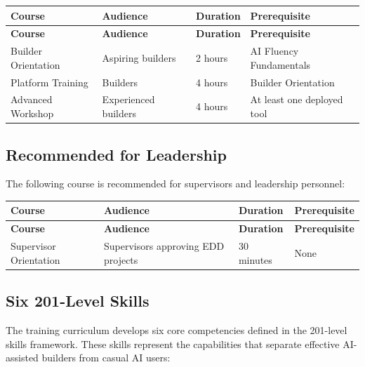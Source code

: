 \documentclass[11pt,letterpaper]{article}
\begin{document}
\begin{longtable}{@{}p{3.5cm}p{3.5cm}p{2cm}p{4.5cm}@{}}
\toprule
\textbf{Course} & \textbf{Audience} & \textbf{Duration} & \textbf{Prerequisite} \\
\midrule
\endfirsthead
\toprule
\textbf{Course} & \textbf{Audience} & \textbf{Duration} & \textbf{Prerequisite} \\
\midrule
\endhead
\bottomrule
\endlastfoot
Builder Orientation & Aspiring builders & 2 hours & AI Fluency Fundamentals \\
\midrule
Platform Training & Builders & 4 hours & Builder Orientation \\
\midrule
Advanced Workshop & Experienced builders & 4 hours & At least one deployed tool \\
\end{longtable}

\subsection{Recommended for Leadership}
\label{sec:training-leadership}

The following course is recommended for supervisors and leadership personnel:

\begin{longtable}{@{}p{3.5cm}p{4.5cm}p{2cm}p{3.5cm}@{}}
\toprule
\textbf{Course} & \textbf{Audience} & \textbf{Duration} & \textbf{Prerequisite} \\
\midrule
\endfirsthead
\toprule
\textbf{Course} & \textbf{Audience} & \textbf{Duration} & \textbf{Prerequisite} \\
\midrule
\endhead
\bottomrule
\endlastfoot
Supervisor Orientation & Supervisors approving EDD projects & 30 minutes & None \\
\end{longtable}

\subsection{Six 201-Level Skills}
\label{sec:six-skills}

The training curriculum develops six core competencies defined in the 201-level skills framework.
These skills represent the capabilities that separate effective AI-assisted builders from casual AI users:
\end{document}
